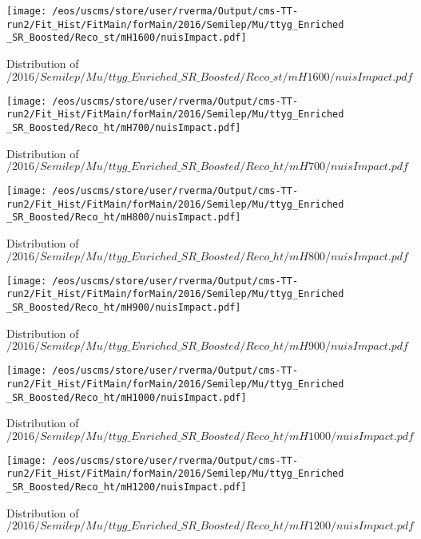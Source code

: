\begin{figure}
\centering
\texttt{[image: /eos/uscms/store/user/rverma/Output/cms-TT-run2/Fit\_Hist/FitMain/forMain/2016/Semilep/Mu/ttyg\_Enriched\_SR\_Boosted/Reco\_st/mH1600/nuisImpact.pdf]}
\caption{Distribution of $/2016/Semilep/Mu/ttyg\_Enriched\_SR\_Boosted/Reco\_st/mH1600/nuisImpact.pdf$}
\end{figure}

\begin{figure}
\centering
\texttt{[image: /eos/uscms/store/user/rverma/Output/cms-TT-run2/Fit\_Hist/FitMain/forMain/2016/Semilep/Mu/ttyg\_Enriched\_SR\_Boosted/Reco\_ht/mH700/nuisImpact.pdf]}
\caption{Distribution of $/2016/Semilep/Mu/ttyg\_Enriched\_SR\_Boosted/Reco\_ht/mH700/nuisImpact.pdf$}
\end{figure}

\begin{figure}
\centering
\texttt{[image: /eos/uscms/store/user/rverma/Output/cms-TT-run2/Fit\_Hist/FitMain/forMain/2016/Semilep/Mu/ttyg\_Enriched\_SR\_Boosted/Reco\_ht/mH800/nuisImpact.pdf]}
\caption{Distribution of $/2016/Semilep/Mu/ttyg\_Enriched\_SR\_Boosted/Reco\_ht/mH800/nuisImpact.pdf$}
\end{figure}

\begin{figure}
\centering
\texttt{[image: /eos/uscms/store/user/rverma/Output/cms-TT-run2/Fit\_Hist/FitMain/forMain/2016/Semilep/Mu/ttyg\_Enriched\_SR\_Boosted/Reco\_ht/mH900/nuisImpact.pdf]}
\caption{Distribution of $/2016/Semilep/Mu/ttyg\_Enriched\_SR\_Boosted/Reco\_ht/mH900/nuisImpact.pdf$}
\end{figure}

\begin{figure}
\centering
\texttt{[image: /eos/uscms/store/user/rverma/Output/cms-TT-run2/Fit\_Hist/FitMain/forMain/2016/Semilep/Mu/ttyg\_Enriched\_SR\_Boosted/Reco\_ht/mH1000/nuisImpact.pdf]}
\caption{Distribution of $/2016/Semilep/Mu/ttyg\_Enriched\_SR\_Boosted/Reco\_ht/mH1000/nuisImpact.pdf$}
\end{figure}

\begin{figure}
\centering
\texttt{[image: /eos/uscms/store/user/rverma/Output/cms-TT-run2/Fit\_Hist/FitMain/forMain/2016/Semilep/Mu/ttyg\_Enriched\_SR\_Boosted/Reco\_ht/mH1200/nuisImpact.pdf]}
\caption{Distribution of $/2016/Semilep/Mu/ttyg\_Enriched\_SR\_Boosted/Reco\_ht/mH1200/nuisImpact.pdf$}
\end{figure}

